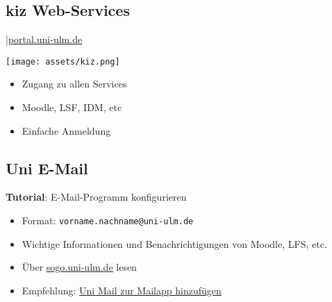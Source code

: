 \documentclass[
	aspectratio=169, 
	8pt 
]{beamer}
\begin{document}
\subsection{kiz Web-Services}
\begin{frame}{\insertsubsection \space|\space\underline{\href{https://portal.uni-ulm.de}{portal.uni-ulm.de}}}
    \begin{fancycolumns}[widths={60}]
        \texttt{[image: assets/kiz.png]}
        \nextcolumn
        \begin{itemize}
            \item Zugang zu allen Services
            \item Moodle, LSF, IDM, etc
            \item Einfache Anmeldung 
        \end{itemize}
    \end{fancycolumns}
\end{frame}

\subsection{Uni E-Mail}
\begin{frame}{\insertsubsection}
    \begin{fancycolumns}[T, widths={30}]
        \begin{center}
            \textbf{Tutorial}: E-Mail-Programm konfigurieren
        \end{center}    
        \nextcolumn
        \begin{itemize}
            \item Format: \lstinline|vorname.nachname@uni-ulm.de|
            \item Wichtige Informationen und Benachrichtigungen von Moodle, LFS, etc.
            \item Über \underline{\href{https://sogo.uni-ulm.de}{sogo.uni-ulm.de}} lesen
            \item Empfehlung: \underline{\href{https://www.uni-ulm.de/einrichtungen/kiz/service-katalog/e-mail-kalender-zusammenarbeit/e-mail/e-mail-programme-konfigurieren/}{Uni Mail zur Mailapp hinzufügen}}
        \end{itemize}
    \end{fancycolumns}
\end{frame}
\end{document}
